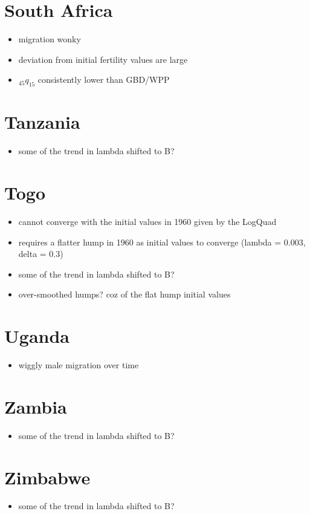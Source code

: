 \documentclass[12pt,a4paper]{article}
\begin{document}
\section*{South Africa}
\begin{itemize}
\item migration wonky
\item deviation from initial fertility values are large
\item $_{45}q_{15}$ consistently lower than GBD/WPP
\end{itemize}

\section*{Tanzania}
\begin{itemize}
\item some of the trend in lambda shifted to B?
\end{itemize}

\section*{Togo}
\begin{itemize}
\item cannot converge with the initial values in 1960 given by the LogQuad
\item requires a flatter hump in 1960 as initial values to converge (lambda = 0.003, delta = 0.3)
\item some of the trend in lambda shifted to B?
\item over-smoothed humps? coz of the flat hump initial values
\end{itemize}

\section*{Uganda}
\begin{itemize}
\item wiggly male migration over time
\end{itemize}

\section*{Zambia}
\begin{itemize}
\item some of the trend in lambda shifted to B?
\end{itemize}

\section*{Zimbabwe}
\begin{itemize}
\item some of the trend in lambda shifted to B?
\end{itemize}
\end{document}
